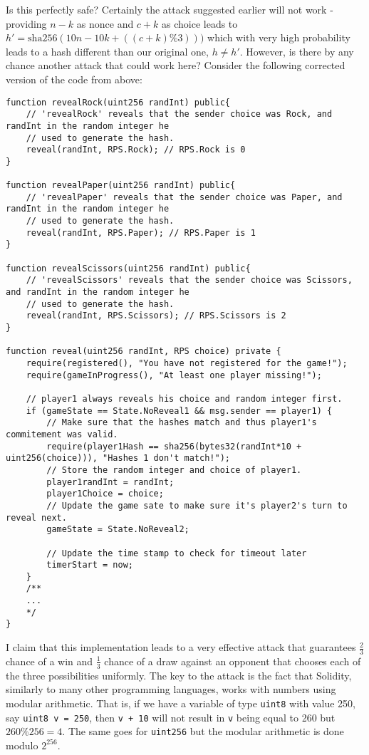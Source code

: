 \documentclass{article}
\begin{document}
    \noindent Is this perfectly safe? Certainly the attack
    suggested earlier will not work - providing \(n - k\) as
    nonce and \(c + k\) as choice leads to \(h' =
    \text{sha256}(10n - 10k + ((c + k) \% 3)))\) which with
    very high probability leads to a hash different than our
    original one, \(h \neq h'\). However, is there by any
    chance another attack that could work here? Consider the
    following corrected version of the code from above:

    \begin{lstlisting}[language=Solidity]
function revealRock(uint256 randInt) public{
    // 'revealRock' reveals that the sender choice was Rock, and randInt in the random integer he
    // used to generate the hash.
    reveal(randInt, RPS.Rock); // RPS.Rock is 0
}

function revealPaper(uint256 randInt) public{
    // 'revealPaper' reveals that the sender choice was Paper, and randInt in the random integer he
    // used to generate the hash.
    reveal(randInt, RPS.Paper); // RPS.Paper is 1
}

function revealScissors(uint256 randInt) public{
    // 'revealScissors' reveals that the sender choice was Scissors, and randInt in the random integer he
    // used to generate the hash.
    reveal(randInt, RPS.Scissors); // RPS.Scissors is 2
}

function reveal(uint256 randInt, RPS choice) private {
    require(registered(), "You have not registered for the game!");
    require(gameInProgress(), "At least one player missing!");

    // player1 always reveals his choice and random integer first.
    if (gameState == State.NoReveal1 && msg.sender == player1) {
        // Make sure that the hashes match and thus player1's commitement was valid.
        require(player1Hash == sha256(bytes32(randInt*10 + uint256(choice))), "Hashes 1 don't match!");
        // Store the random integer and choice of player1.
        player1randInt = randInt;
        player1Choice = choice;
        // Update the game sate to make sure it's player2's turn to reveal next.
        gameState = State.NoReveal2;

        // Update the time stamp to check for timeout later
        timerStart = now;
    }
    /**
    ...
    */
}
    \end{lstlisting}

    \noindent I claim that this implementation leads to a
    very effective attack that guarantees \(\frac{2}{3}\)
    chance of a win and \(\frac{1}{3}\) chance of a draw
    against an opponent that chooses each of the three
    possibilities uniformly. The key to the attack is the
    fact that Solidity, similarly to many other programming
    languages, works with numbers using modular arithmetic.
    That is, if we have a variable of type \verb|uint8| with
    value 250, say \verb|uint8 v = 250|, then \verb|v + 10|
    will not result in \verb|v| being equal to 260 but \(260
    \% 256 = 4\). The same goes for \verb|uint256| but the
    modular arithmetic is done modulo \(2^{256}\).
    \newline
\end{document}
